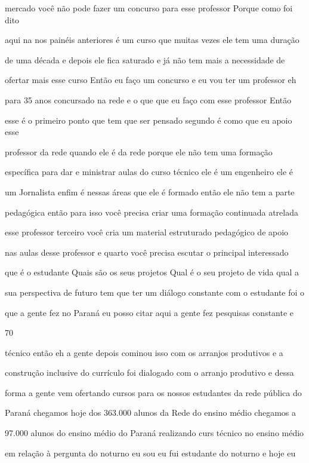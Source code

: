 \documentclass[a4paper,12pt]{article}
\begin{document}
mercado você não pode fazer um concurso para esse professor Porque como foi dito

aqui na nos painéis anteriores é um curso que muitas vezes ele tem uma duração

de uma década e depois ele fica saturado e já não tem mais a necessidade de

ofertar mais esse curso Então eu faço um concurso e eu vou ter um professor eh

para 35 anos concursado na rede e o que que eu faço com esse professor Então

esse é o primeiro ponto que tem que ser pensado segundo é como que eu apoio esse

professor da rede quando ele é da rede porque ele não tem uma formação

específica para dar e ministrar aulas do curso técnico ele é um engenheiro ele é

um Jornalista enfim é nessas áreas que ele é formado então ele não tem a parte

pedagógica então para isso você precisa criar uma formação continuada atrelada

esse professor terceiro você cria um material estruturado pedagógico de apoio

nas aulas desse professor e quarto você precisa escutar o principal interessado

que é o estudante Quais são os seus projetos Qual é o seu projeto de vida qual a

sua perspectiva de futuro tem que ter um diálogo constante com o estudante foi o

que a gente fez no Paraná eu posso citar aqui a gente fez pesquisas constante e

70%

técnico então eh a gente depois cominou isso com os arranjos produtivos e a

construção inclusive do currículo foi dialogado com o arranjo produtivo e dessa

forma a gente vem ofertando cursos para os nossos estudantes da rede pública do

Paraná chegamos hoje dos 363.000 alunos da Rede do ensino médio chegamos a

97.000 alunos do ensino médio do Paraná realizando curs técnico no ensino médio

em relação à pergunta do noturno eu sou eu fui estudante do noturno e hoje eu
\end{document}
